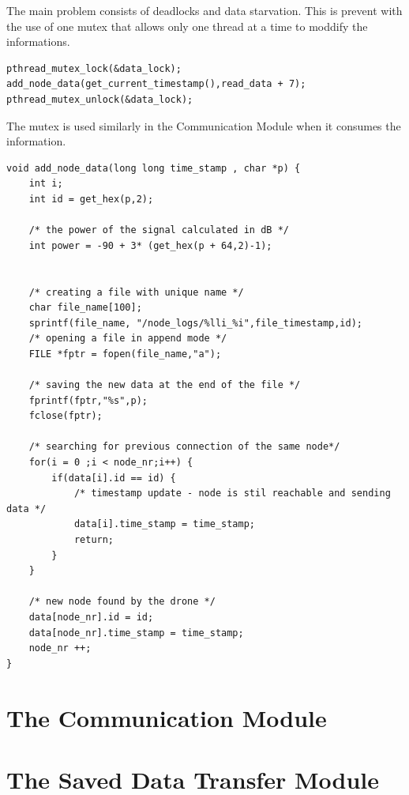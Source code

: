 The main problem consists of deadlocks and data starvation. This is prevent with the use of one mutex that allows only one thread at a time to moddify the informations.

\lstset{numbers=none, mathescape=true, nolol=false,caption=Data Collection use of mutex,label=lst:task}
\begin{lstlisting}
pthread_mutex_lock(&data_lock); 
add_node_data(get_current_timestamp(),read_data + 7);
pthread_mutex_unlock(&data_lock);
\end{lstlisting}

The mutex is used similarly in the Communication Module when it consumes the information.

\lstset{numbers=none, mathescape=true, nolol=false,caption=Data Collection use of mutex,label=lst:task}
\begin{lstlisting}
void add_node_data(long long time_stamp , char *p) {
	int i;
	int id = get_hex(p,2);

	/* the power of the signal calculated in dB */	
	int power = -90 + 3* (get_hex(p + 64,2)-1);


	/* creating a file with unique name */
	char file_name[100];
	sprintf(file_name, "/node_logs/%lli_%i",file_timestamp,id);
	/* opening a file in append mode */	
	FILE *fptr = fopen(file_name,"a");
	
	/* saving the new data at the end of the file */
	fprintf(fptr,"%s",p);
	fclose(fptr);
	
	/* searching for previous connection of the same node*/
	for(i = 0 ;i < node_nr;i++) {
		if(data[i].id == id) {
			/* timestamp update - node is stil reachable and sending data */
			data[i].time_stamp = time_stamp;
			return;
		}
	}

	/* new node found by the drone */
	data[node_nr].id = id;
	data[node_nr].time_stamp = time_stamp;
	node_nr ++;
}

\end{lstlisting}


\clearpage

\section{The Communication Module}


\clearpage

\section{The Saved Data Transfer Module}
